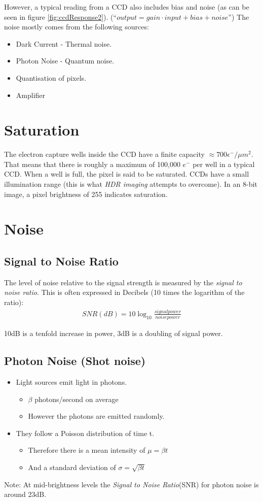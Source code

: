 \documentclass{article}
\begin{document}
However, a typical reading from a CCD also includes bias and noise (as can be seen in figure \ref{fig:ccdResponse2}).
(``$output = gain \cdot input + bias + noise$'')
The noise mostly comes from the following sources:
\begin{itemize}
	\item Dark Current - Thermal noise.
	\item Photon Noise - Quantum noise.
	\item Quantisation of pixels.
	\item Amplifier
\end{itemize}
\newpage
\section{Saturation}
The electron capture wells inside the CCD have a finite capacity $\approx 700 \epsilon ^-/\mu m^2$.
That means that there is roughly a maximum of 100,000 $e^-$ per well in a typical CCD.
When a well is full, the pixel is said to be saturated.
CCDs have a small illumination range (this is what {\it HDR imaging} attempts to overcome).
In an 8-bit image, a pixel brightness of 255 indicates saturation.
\section{Noise}
\subsection{Signal to Noise Ratio}
The level of noise relative to the signal strength is measured by the {\it signal to noise ratio}. This is often expressed in Decibels (10 times the logarithm of the ratio):
\begin{align*}
SNR (dB) = 10\log _{10}\frac{signal power}{noise power}
\end{align*}

10dB is a tenfold increase in power, 3dB is a doubling of signal power.

\subsection{Photon Noise (Shot noise)}
\begin{itemize}
	\item Light sources emit light in photons.
		\begin{itemize}
			\item $\beta$ photons/second on average 
			\item However the photons are emitted randomly.
		\end{itemize}
	\item They follow a Poisson distribution of time t.
		\begin{itemize}
			\item Therefore there is a mean intensity of $\mu = \beta t$
			\item And a standard deviation of $\sigma = \sqrt{\beta t}$
		\end{itemize}
\end{itemize}
Note: At mid-brightness levels the {\it Signal to Noise Ratio}(SNR) for photon noise is around 23dB.
\end{document}
